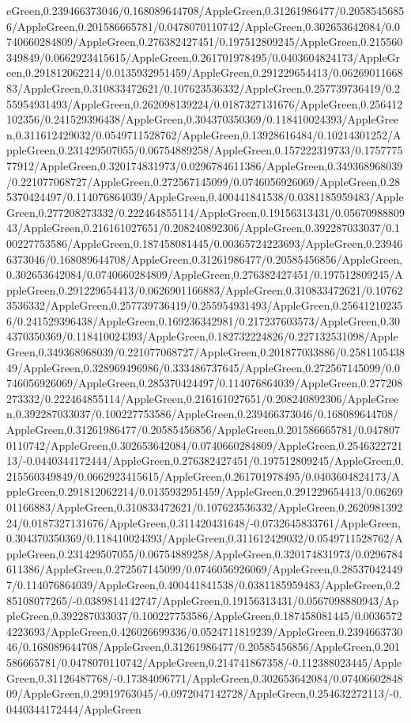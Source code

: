 {\begin{tikzternal}
{eGreen,0.239466373046/0.168089644708/AppleGreen,0.31261986477/0.20585456856/AppleGreen,0.201586665781/0.0478070110742/AppleGreen,0.302653642084/0.0740660284809/AppleGreen,0.276382427451/0.197512809245/AppleGreen,0.215560349849/0.0662923415615/AppleGreen,0.261701978495/0.0403604824173/AppleGreen,0.291812062214/0.0135932951459/AppleGreen,0.291229654413/0.0626901166883/AppleGreen,0.310833472621/0.107623536332/AppleGreen,0.257739736419/0.255954931493/AppleGreen,0.262098139224/0.0187327131676/AppleGreen,0.256412102356/0.241529396438/AppleGreen,0.304370350369/0.118410024393/AppleGreen,0.311612429032/0.0549711528762/AppleGreen,0.13928616484/0.10214301252/AppleGreen,0.231429507055/0.06754889258/AppleGreen,0.157222319733/0.175777577912/AppleGreen,0.320174831973/0.0296784611386/AppleGreen,0.349368968039/0.221077068727/AppleGreen,0.272567145099/0.0746056926069/AppleGreen,0.285370424497/0.114076864039/AppleGreen,0.400441841538/0.0381185959483/AppleGreen,0.277208273332/0.222464855114/AppleGreen,0.19156313431/0.0567098880943/AppleGreen,0.216161027651/0.208240892306/AppleGreen,0.392287033037/0.100227753586/AppleGreen,0.187458081445/0.00365724223693/AppleGreen,0.239466373046/0.168089644708/AppleGreen,0.31261986477/0.20585456856/AppleGreen,0.302653642084/0.0740660284809/AppleGreen,0.276382427451/0.197512809245/AppleGreen,0.291229654413/0.0626901166883/AppleGreen,0.310833472621/0.107623536332/AppleGreen,0.257739736419/0.255954931493/AppleGreen,0.256412102356/0.241529396438/AppleGreen,0.169236342981/0.217237603573/AppleGreen,0.304370350369/0.118410024393/AppleGreen,0.182732224826/0.227132531098/AppleGreen,0.349368968039/0.221077068727/AppleGreen,0.201877033886/0.258110543849/AppleGreen,0.328969496986/0.333486737645/AppleGreen,0.272567145099/0.0746056926069/AppleGreen,0.285370424497/0.114076864039/AppleGreen,0.277208273332/0.222464855114/AppleGreen,0.216161027651/0.208240892306/AppleGreen,0.392287033037/0.100227753586/AppleGreen,0.239466373046/0.168089644708/AppleGreen,0.31261986477/0.20585456856/AppleGreen,0.201586665781/0.0478070110742/AppleGreen,0.302653642084/0.0740660284809/AppleGreen,0.254632272113/-0.0440344172444/AppleGreen,0.276382427451/0.197512809245/AppleGreen,0.215560349849/0.0662923415615/AppleGreen,0.261701978495/0.0403604824173/AppleGreen,0.291812062214/0.0135932951459/AppleGreen,0.291229654413/0.0626901166883/AppleGreen,0.310833472621/0.107623536332/AppleGreen,0.262098139224/0.0187327131676/AppleGreen,0.311420431648/-0.0732645833761/AppleGreen,0.304370350369/0.118410024393/AppleGreen,0.311612429032/0.0549711528762/AppleGreen,0.231429507055/0.06754889258/AppleGreen,0.320174831973/0.0296784611386/AppleGreen,0.272567145099/0.0746056926069/AppleGreen,0.285370424497/0.114076864039/AppleGreen,0.400441841538/0.0381185959483/AppleGreen,0.285108077265/-0.0389814142747/AppleGreen,0.19156313431/0.0567098880943/AppleGreen,0.392287033037/0.100227753586/AppleGreen,0.187458081445/0.00365724223693/AppleGreen,0.426026699336/0.0524711819239/AppleGreen,0.239466373046/0.168089644708/AppleGreen,0.31261986477/0.20585456856/AppleGreen,0.201586665781/0.0478070110742/AppleGreen,0.214741867358/-0.112388023445/AppleGreen,0.31126487768/-0.17384096771/AppleGreen,0.302653642084/0.0740660284809/AppleGreen,0.29919763045/-0.0972047142728/AppleGreen,0.254632272113/-0.0440344172444/AppleGreen}
\end{tikzternal}}
